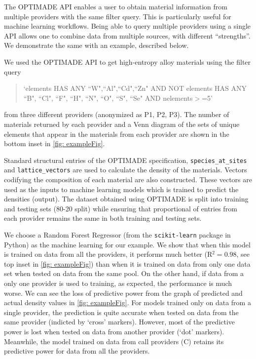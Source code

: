 \documentclass{article}
\begin{document}
	The OPTIMADE API enables a user to obtain material information from multiple providers with the same filter query. This is particularly useful for machine learning workflows. Being able to query multiple providers using a single API allows one to combine data from multiple sources, with different ``strengths''. We demonstrate the same with an example, described below.
	
	We used the OPTIMADE API to get high-entropy alloy materials using the filter query 
	\begin{quote}
		`elements HAS ANY ``W",``Al",``Cd",``Zn" AND NOT elements HAS ANY ``B", ``Cl", ``F", ``H", ``N", ``O", ``S", ``Se" AND nelements$>$=5'		
	\end{quote}
	from three different providers (anonymized as P1, P2, P3). The number of materials returned by each provider and a Venn diagram of the sets of unique elements that appear in the materials from each provider are shown in the bottom inset in \autoref{fig: exampleFig}.

	Standard structural entries of the OPTIMADE specification, \verb|species_at_sites| and \verb|lattice_vectors| are used to calculate the density of the materials. Vectors codifying the composition of each material are also constructed. These vectors are used as the inputs to machine learning models which is trained to predict the densities (output). The dataset obtained using OPTIMADE is split into training and testing sets (80-20 split) while ensuring that proportional of entries from each provider remains the same in both training and testing sets.

	We choose a Random Forest Regressor (from the \verb|scikit-learn| package in Python) as the machine learning  for our example. We show that when this model is trained on data from all the providers, it performs much better (R$^2 = 0.98$, see top inset in \autoref{fig: exampleFig}) than when it is trained on data from only one data set when tested on data from the same pool. On the other hand, if data from a only one provider is used to training, as expected, the performance is much worse. We can see the loss of predictive power from the graph of predicted and actual density values in \autoref{fig: exampleFig}. For models trained only on data from a single provider, the prediction is quite accurate when tested on data from the same provider (indicted by `cross' markers). However, most of the predictive power is lost when tested on data from another provider (`dot' markers). Meanwhile, the model trained on data from call providers (C) retains its predictive power for data from all the providers.
\end{document}
